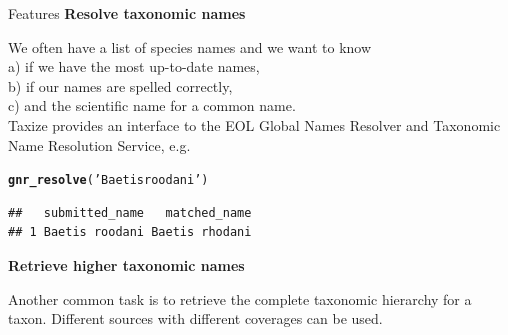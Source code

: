\documentclass[final,t]{beamer}\usepackage[]{graphicx}\usepackage[]{color}
\makeatletter
\newcommand{\hlstr}[1]{\textcolor[rgb]{0.192,0.494,0.8}{#1}}%
\newcommand{\hlstd}[1]{\textcolor[rgb]{0.345,0.345,0.345}{#1}}%
\newcommand{\hlkwd}[1]{\textcolor[rgb]{0.737,0.353,0.396}{\textbf{#1}}}%
\newenvironment{kframe}{%
 \def\at@end@of@kframe{}%
 \ifinner\ifhmode%
  \def\at@end@of@kframe{\end{minipage}}%
  \begin{minipage}{\columnwidth}%
 \fi\fi%
 \def\FrameCommand##1{\hskip\@totalleftmargin \hskip-\fboxsep
 \colorbox{shadecolor}{##1}\hskip-\fboxsep
     \hskip-\linewidth \hskip-\@totalleftmargin \hskip\columnwidth}%
 \MakeFramed {\advance\hsize-\width
   \@totalleftmargin\z@ \linewidth\hsize
   \@setminipage}}%
 {\par\unskip\endMakeFramed%
 \at@end@of@kframe}
\newenvironment{knitrout}{}{} %
\renewenvironment{knitrout}{}{\vspace{-1.8em}}
\makeatother
\begin{document}
\begin{frame}[fragile]
\begin{columns}[t]
\begin{column}{.485\linewidth}
			\begin{block}{Features}
				\textcolor{i6bluedark}{\textbf{\large Resolve taxonomic names}}
        \vspace{0.5em}
        \par
        \begingroup
        \leftskip=2cm
        \noindent 
          We often have a list of species names and we want to know \\[0.5em]
          a) if we have the most up-to-date names, \\
          b) if our names are spelled correctly,  \\
          c) and the scientific name for a common name.\\[0.5em]
          Taxize provides an interface to the EOL Global Names Resolver and Taxonomic Name Resolution Service, e.g.
        \par
        \endgroup

\begin{knitrout}\footnotesize
{}\color{fgcolor}\begin{kframe}
\begin{alltt}
\hlkwd{gnr_resolve}\hlstd{(}\hlstr{'Baetis roodani'}\hlstd{)}
\end{alltt}
\end{kframe}
\end{knitrout}
\begin{knitrout}\footnotesize
{}\color{fgcolor}\begin{kframe}
\begin{verbatim}
##   submitted_name   matched_name
## 1 Baetis roodani Baetis rhodani
\end{verbatim}
\end{kframe}
\end{knitrout}
\vspace{2em}
					
\textcolor{i6bluedark}{\textbf{\large Retrieve higher taxonomic names}} 
        \vspace{0.5em}
        \par
        \begingroup
        \leftskip=2cm
        \noindent 
          Another common task is to retrieve the complete taxonomic hierarchy for a taxon.
          Different sources with different coverages can be used.
        \par
        \endgroup


\end{block}
\end{column}
\end{columns}
\end{frame}
\end{document}
